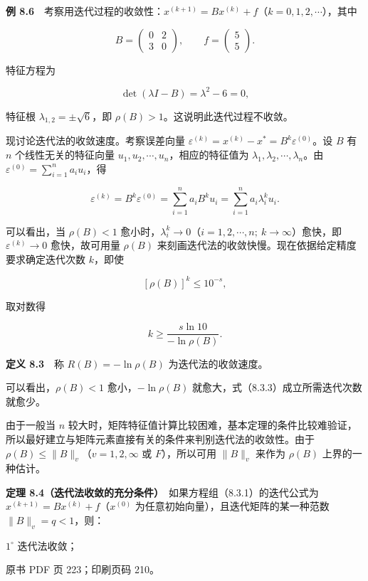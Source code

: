 \textbf{例 8.6}　考察用迭代过程的收敛性：\(x^{(k+1)}=Bx^{(k)}+f\)（\(k=0,1,2,\cdots\)），其中

\[
B=\begin{pmatrix}0&2\\3&0\end{pmatrix},\qquad f=\begin{pmatrix}5\\5\end{pmatrix}.
\]

特征方程为

\[
\det(\lambda I-B)=\lambda^2-6=0,
\]

特征根 \(\lambda_{1,2}=\pm\sqrt6\)，即 \(\rho(B)>1\)。这说明此迭代过程不收敛。

现讨论迭代法的收敛速度。考察误差向量 \(\varepsilon^{(k)}=x^{(k)}-x^*=B^k\varepsilon^{(0)}\)。设 \(B\) 有 \(n\) 个线性无关的特征向量 \(u_1,u_2,\cdots,u_n\)，相应的特征值为 \(\lambda_1,\lambda_2,\cdots,\lambda_n\)。由 \(\varepsilon^{(0)}=\sum\limits_{i=1}^n a_i u_i\)，得

\[
\varepsilon^{(k)}=B^k\varepsilon^{(0)}=\sum_{i=1}^n a_i B^k u_i=\sum_{i=1}^n a_i\lambda_i^k u_i.
\]

可以看出，当 \(\rho(B)<1\) 愈小时，\(\lambda_i^k\to0\)（\(i=1,2,\cdots,n;\ k\to\infty\)）愈快，即 \(\varepsilon^{(k)}\to0\) 愈快，故可用量 \(\rho(B)\) 来刻画迭代法的收敛快慢。现在依据给定精度要求确定迭代次数 \(k\)，即使

\[
[\rho(B)]^k\leqslant10^{-s},
\tag{8.3.3}
\]

取对数得

\[
k\geqslant\frac{s\ln10}{-\ln\rho(B)}.
\]

\textbf{定义 8.3}　称 \(R(B)=-\ln\rho(B)\) 为迭代法的收敛速度。

可以看出，\(\rho(B)<1\) 愈小，\(-\ln\rho(B)\) 就愈大，式（8.3.3）成立所需迭代次数就愈少。

由于一般当 \(n\) 较大时，矩阵特征值计算比较困难，基本定理的条件比较难验证，所以最好建立与矩阵元素直接有关的条件来判别迭代法的收敛性。由于 \(\rho(B)\leqslant\|B\|_v\)（\(v=1,2,\infty\) 或 \(F\)），所以可用 \(\|B\|_v\) 来作为 \(\rho(B)\) 上界的一种估计。

\textbf{定理 8.4（迭代法收敛的充分条件）}　如果方程组（8.3.1）的迭代公式为 \(x^{(k+1)}=Bx^{(k)}+f\)（\(x^{(0)}\) 为任意初始向量），且迭代矩阵的某一种范数 \(\|B\|_v=q<1\)，则：

\(1^\circ\) 迭代法收敛；

\clearpage

原书 PDF 页 223；印刷页码 210。

